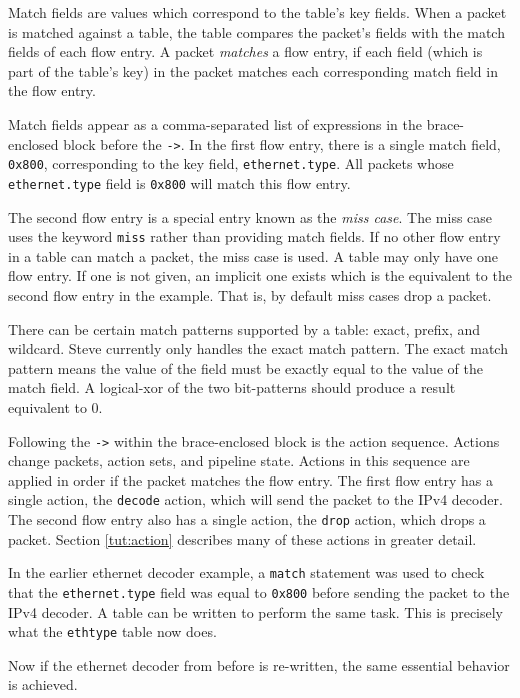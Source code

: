 Match fields are values which
correspond to the table's key fields. When a packet is matched against a table,
the table compares the packet's fields with the match fields of each flow entry.
A packet \textit{matches} a flow entry, if each field (which is part of the
table's key) in the packet matches each corresponding match field in the flow entry. 

Match
fields appear as a comma-separated list of expressions in the brace-enclosed
block before the \texttt{->}. In the first flow entry, there is a single match field,
\texttt{0x800}, corresponding to the key field, \texttt{ethernet.type}.
All packets whose \texttt{ethernet.type} field is \texttt{0x800} will match
this flow entry. 

The second flow entry is a special entry known as the \textit{miss case}. The miss case uses the keyword \texttt{miss} rather than providing match fields. If no other flow entry in a table can match a packet, the miss case is used. A table may only have one flow entry. If one is not given, an implicit one exists which is the equivalent to the second flow entry in the example. That is, by default miss cases drop a packet.

There can be certain match patterns supported by a table: exact, prefix, and wildcard. Steve currently only handles the exact match pattern. The exact match pattern means the value of the field must be exactly equal to the value of the match field. A logical-xor of the two bit-patterns should produce a result equivalent to 0.

Following the \texttt{->} within the brace-enclosed block is
the action sequence. Actions change packets, action sets, and pipeline state.
Actions in this sequence are applied in
order if the packet matches the flow entry. The first flow entry has a single action, the \texttt{decode} action, which
will send the packet to the IPv4 decoder. The second flow entry also has a single action, the \texttt{drop} action, which drops a packet. Section \ref{tut:action}
describes many of these actions in greater detail.

In the earlier ethernet decoder example, a \texttt{match} statement was used to check that the \texttt{ethernet.type} field was equal to \texttt{0x800} before sending the packet to the IPv4 decoder. A table can be written to perform the same task. This is precisely what the \texttt{ethtype} table now does.

Now if the ethernet decoder from before is re-written, the same essential behavior is achieved.

